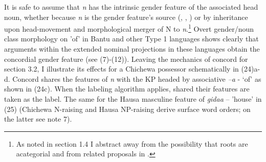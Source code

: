 \documentclass[output=paper
,modfonts
,nonflat]{langsci/langscibook}
\begin{document}
It is safe to assume that \textit{n} has the intrinsic gender feature of the associated head noun, whether because \textit{n} is the gender feature's source (\citealt{Kramer2015}, \citealt{Kihm2005}, \citealt{Lecarme2002}) or by inheritance upon head-movement and morphological merger of N to \textit{n}.\footnote{As noted in section 1.4 I abstract away from the possibility that roots are acategorial and from related proposals in \citet{Chomsky2015}.} Overt gender/noun class morphology on 'of' in Bantu and other Type 1 languages shows clearly that arguments within the extended nominal projections in these languages obtain the concordial gender feature (see (7)-(12)). Leaving the mechanics of concord for section 3.2, I illustrate its effects for a Chichewa possessor schematically in (24)a-d. Concord shares the features of \textit{n} with the KP headed by associative \textit{–a} - ‘of’ as shown in (24c). When the labeling algorithm applies, shared their features are taken as the label. The same for the Hausa masculine feature of \textit{gidaa} – 'house' in (25) (Chichewa N-raising and Hausa NP-raising derive surface word orders; on the latter see note 7). 
\end{document}
